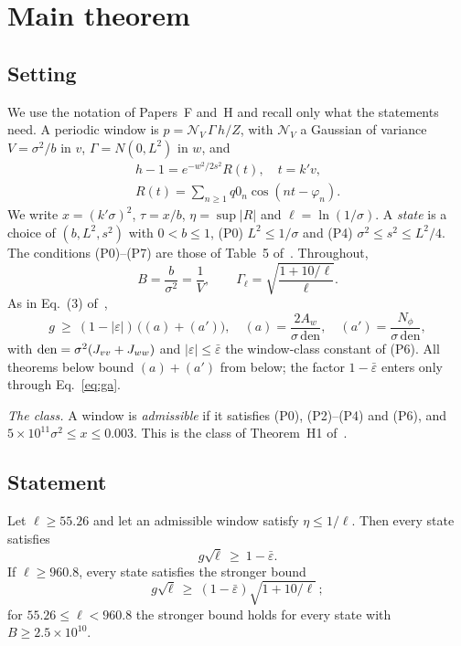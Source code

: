 \section{Main theorem}
\label{sec:main}

\subsection{Setting}
We use the notation of Papers~F and~H and recall only what the statements need.
A periodic window is $p=\mathcal N_V\,\Gamma\,h/Z$, with $\mathcal N_V$ a Gaussian of variance $V=\sigma^2/b$ in $v$, $\Gamma=N(0,L^2)$ in $w$, and
\begin{gather}
h-1=e^{-w^2/2s^2}R(t),\quad t=k'v,\\ R(t)=\sum_{n\ge1}q0_n\cos(nt-\varphi_n).
\end{gather}
We write $x=(k'\sigma)^2$, $\tau=x/b$, $\eta=\sup|R|$ and $\ell=\ln(1/\sigma)$.
A \emph{state} is a choice of $(b,L^2,s^2)$ with $0<b\le1$, (P0) $L^2\le1/\sigma$ and (P4) $\sigma^2\le s^2\le L^2/4$.
The conditions (P0)--(P7) are those of Table~5 of~\cite{F}.
Throughout,
\begin{equation}
B=\frac{b}{\sigma^2}=\frac1V,\qquad \Gamma_\ell=\sqrt{\frac{1+10/\ell}{\ell}} .
\end{equation}
As in Eq.~(3) of~\cite{F},
\begin{equation}
g\ \ge\ (1-|\varepsilon|)\,\bigl((a)+(a')\bigr),\quad (a)=\frac{2A_w}{\sigma\,\mathrm{den}},\quad (a')=\frac{N_\phi}{\sigma\,\mathrm{den}},
\label{eq:ga}
\end{equation}
with $\mathrm{den}=\sigma^2(J_{vv}+J_{ww})$ and $|\varepsilon|\le\bar\varepsilon$ the window-class constant of (P6).
All theorems below bound $(a)+(a')$ from below; the factor $1-\bar\varepsilon$ enters only through Eq.~\eqref{eq:ga}.

\emph{The class.} A window is \emph{admissible} if it satisfies (P0), (P2)--(P4) and (P6), and $5\times10^{11}\sigma^2\le x\le0.003$.
This is the class of Theorem~H1 of~\cite{H}.

\subsection{Statement}

\begin{theorem} 
\label{thm:main}
Let $\ell\ge55.26$ and let an admissible window satisfy $\eta\le1/\ell$.
Then every state satisfies
\begin{equation}
g\sqrt\ell\ \ge\ 1-\bar\varepsilon .
\end{equation}
If $\ell\ge960.8$, every state satisfies the stronger bound
\begin{equation}
g\sqrt\ell\ \ge\ (1-\bar\varepsilon)\sqrt{1+10/\ell}\,;
\end{equation}
for $55.26\le\ell<960.8$ the stronger bound holds for every state with $B\ge2.5\times10^{10}$.
\end{theorem}

